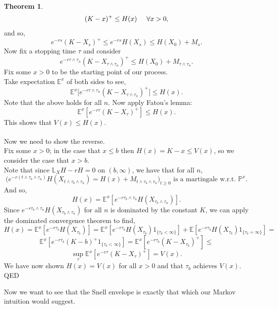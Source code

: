 \documentclass[12pt]{article}
\newcommand{\E}{\mathbb{E}}
\newcommand{\bL}{\mathbb{L}}
\newcommand{\Prb}{\mathbb{P}}
\newcommand{\spc}{\hspace{7 px}}
\newcommand{\ind}[1]{1_{\{#1\}}}
\newcommand{\QED}{\hspace*{\fill}\textup{QED}}
\theoremstyle{definition}
\newtheorem{thm}{Theorem}
\begin{document}
\begin{thm}
    \[
        (K - x)^+ \leq H(x) \spc \spc \forall x > 0,
    \]
    and so,
    \[
        e^{-r s} (K - X_s)^+ \leq e^{-rs} H(X_s) \leq H(X_0) + M_s.
    \]
    Now fix a stopping time $\tau$ and consider
    \[
        e^{-r \tau \wedge \tau_n} (K - X_{\tau \wedge \tau_n})^+ \leq H(X_0) + M_{\tau \wedge \tau_n}.
    \]
    Fix some $x > 0$ to be the starting point of our process. \\
    Take expectation $\E^x$ of both sides to see,
    \[
        \E^x \big [
            e^{-r \tau \wedge \tau_n} (K - X_{\tau \wedge \tau_n})^+
        \big ] \leq H(x).
    \]
    Note that the above holds for all $n$. Now apply Fatou's lemma:
    \[
        \E^x[e^{-r \tau} (K - X_{\tau})^+] \leq H(x).
    \]
    This shows that $V(x) \leq H(x)$. \\
    \\
    Now we need to show the reverse. \\
    Fix some $x > 0$; in the case that $x \leq b$ then $H(x) = K - x \leq V(x)$, so we consider the case that $x > b$. \\
    Note that since $\bL_X H - r H = 0$ on $(b, \infty)$, we have that for all $n$,
    \[
        \Big ( e^{ - r (t \wedge \tau_b \wedge \tau_n)} H(X_{t \wedge \tau_b \wedge \tau_n}) = H(x) + M_{t \wedge \tau_b \wedge \tau_n} \Big )_{t \geq 0} \text{ is a martingale w.r.t. } \Prb^x.
    \]
    And so,
    \[
        H(x) = \E^x [e^{-r \tau_b \wedge \tau_n} H(X_{\tau_b \wedge \tau_n})]. %
    \]
    Since $e^{-r \tau_b \wedge \tau_n} H(X_{\tau_b \wedge \tau_n})$ for all $n$ is dominated by the constant $K$, we can apply the dominated convergence theorem to find,
    \[
        H(x) = \E^x [e^{-r \tau_b} H(X_{\tau_b})] = \E^x[e^{-r \tau_b} H(X_{\tau_b}) \ind{\tau_b < \infty}] + \E[e^{-r \tau_b} H(X_{\tau_b}) \ind{\tau_b = \infty}] =
    \]
    \[
        \E^x[e^{-r \tau_b} (K - b)^+ \ind{\tau_b < \infty}] =
        \E^x[e^{-r \tau_b} (K - X_{\tau_b})^+] \leq
    \]
    \[
        \sup_\tau \E^x [e^{-r \tau} (K - X_\tau)^+] = V(x).
    \]
    We have now shown $H(x) = V(x)$ for all $x > 0$ and that $\tau_b$ achieves $V(x)$. \\
    \QED
\end{thm}

Now we want to see that the Snell envelope is exactly that which our Markov intuition would suggest.
\end{document}
